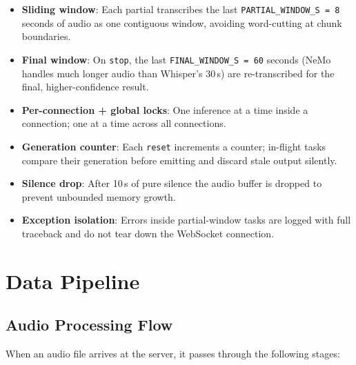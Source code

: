 \begin{emeraldbox}[title=Streaming Implementation Highlights]
\begin{itemize}
  \item \textbf{Sliding window}: Each partial transcribes the last \texttt{PARTIAL\_WINDOW\_S = 8} seconds of audio as one contiguous window, avoiding word-cutting at chunk boundaries.
  \item \textbf{Final window}: On \texttt{stop}, the last \texttt{FINAL\_WINDOW\_S = 60} seconds (NeMo handles much longer audio than Whisper's 30\,s) are re-transcribed for the final, higher-confidence result.
  \item \textbf{Per-connection + global locks}: One inference at a time inside a connection; one at a time across all connections.
  \item \textbf{Generation counter}: Each \texttt{reset} increments a counter; in-flight tasks compare their generation before emitting and discard stale output silently.
  \item \textbf{Silence drop}: After 10\,s of pure silence the audio buffer is dropped to prevent unbounded memory growth.
  \item \textbf{Exception isolation}: Errors inside partial-window tasks are logged with full traceback and do not tear down the WebSocket connection.
\end{itemize}
\end{emeraldbox}

\chapter{Data Pipeline}

\section{Audio Processing Flow}

When an audio file arrives at the server, it passes through the following stages:


